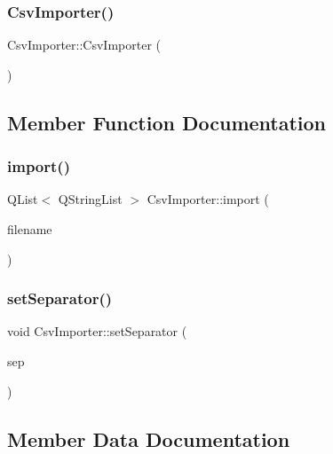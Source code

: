 \subsubsection{\texorpdfstring{CsvImporter()}{CsvImporter()}}
{\footnotesize\ttfamily Csv\+Importer\+::\+Csv\+Importer (\begin{DoxyParamCaption}{ }\end{DoxyParamCaption})}



\subsection{Member Function Documentation}
\mbox{\label{class_csv_importer_a09efc986bbbdca32b8c47c665692b68e}} 
\subsubsection{\texorpdfstring{import()}{import()}}
{\footnotesize\ttfamily Q\+List$<$ Q\+String\+List $>$ Csv\+Importer\+::import (\begin{DoxyParamCaption}\item[{Q\+String}]{filename }\end{DoxyParamCaption})}

\mbox{\label{class_csv_importer_ae82aced25bbd9d0bbbb0842fcb26526d}} 
\subsubsection{\texorpdfstring{setSeparator()}{setSeparator()}}
{\footnotesize\ttfamily void Csv\+Importer\+::set\+Separator (\begin{DoxyParamCaption}\item[{Q\+Char}]{sep }\end{DoxyParamCaption})\hspace{0.3cm}{\ttfamily [inline]}}



\subsection{Member Data Documentation}
\mbox{\label{class_csv_importer_a0a190acb1849e3555bea403a500677e6}} 
